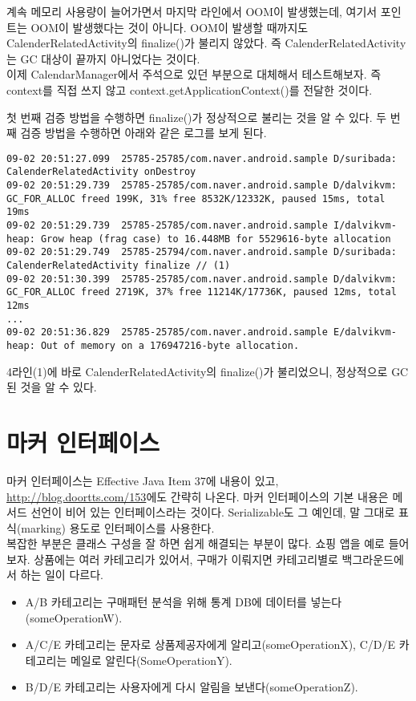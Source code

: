 계속 메모리 사용량이 늘어가면서 마지막 라인에서 OOM이 발생했는데, 여기서 포인트는 OOM이 발생했다는 것이 아니다.
OOM이 발생할 때까지도 CalenderRelatedActivity의 finalize()가 불리지 않았다.
즉 CalenderRelatedActivity는 GC 대상이 끝까지 아니었다는 것이다.\\

이제 CalendarManager에서 주석으로 있던 부분으로 대체해서 테스트해보자.
즉 context를 직접 쓰지 않고 context.getApplicationContext()를 전달한 것이다.

첫 번째 검증 방법을 수행하면 finalize()가 정상적으로 불리는 것을 알 수 있다.
두 번째 검증 방법을 수행하면 아래와 같은 로그를 보게 된다.
\begin{lstlisting}[frame=single]
09-02 20:51:27.099  25785-25785/com.naver.android.sample D/suribada: CalenderRelatedActivity onDestroy
09-02 20:51:29.739  25785-25785/com.naver.android.sample D/dalvikvm: GC_FOR_ALLOC freed 199K, 31% free 8532K/12332K, paused 15ms, total 19ms
09-02 20:51:29.739  25785-25785/com.naver.android.sample I/dalvikvm-heap: Grow heap (frag case) to 16.448MB for 5529616-byte allocation
09-02 20:51:29.749  25785-25794/com.naver.android.sample D/suribada: CalenderRelatedActivity finalize // (1)
09-02 20:51:30.399  25785-25785/com.naver.android.sample D/dalvikvm: GC_FOR_ALLOC freed 2719K, 37% free 11214K/17736K, paused 12ms, total 12ms
...
09-02 20:51:36.829  25785-25785/com.naver.android.sample E/dalvikvm-heap: Out of memory on a 176947216-byte allocation.
\end{lstlisting}
4라인(1)에 바로 CalenderRelatedActivity의 finalize()가 불리었으니, 정상적으로 GC된 것을 알 수 있다.

\section{마커 인터페이스}
마커 인터페이스는 Effective Java Item 37에 내용이 있고, \url{http://blog.doortts.com/153}에도 간략히 나온다.
마커 인터페이스의 기본 내용은 메서드 선언이 비어 있는 인터페이스라는 것이다.
Serializable도 그 예인데, 말 그대로 표식(marking) 용도로 인터페이스를 사용한다.\\

복잡한 부분은 클래스 구성을 잘 하면 쉽게 해결되는 부분이 많다.
쇼핑 앱을 예로 들어보자. 상품에는 여러 카테고리가 있어서, 구매가 이뤄지면 카테고리별로 백그라운드에서 하는 일이 다르다.
\begin{itemize}
\item A/B 카테고리는 구매패턴 분석을 위해 통계 DB에 데이터를 넣는다(someOperationW).
\item A/C/E 카테고리는 문자로 상품제공자에게 알리고(someOperationX), C/D/E 카테고리는 메일로 알린다(SomeOperationY).
\item B/D/E 카테고리는 사용자에게 다시 알림을 보낸다(someOperationZ).
\end{itemize}

